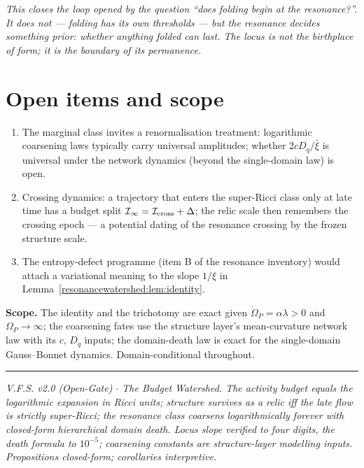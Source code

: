 \documentclass[11pt,a4paper,oneside]{book}
\newcommand{\Op}{\Omega_P}
\newcommand{\note}[1]{\textcolor{black!65}{\emph{#1}}}
\newcommand{\Dq}{D_q}
\newcommand{\Ib}{\mathcal I}
\theoremstyle{plain}
\theoremstyle{definition}
\theoremstyle{remark}
\begin{document}
\note{This closes the loop opened by the question ``does folding begin at the resonance?''. It does
not --- folding has its own thresholds --- but the resonance decides something prior: whether
anything folded can \emph{last}. The locus is not the birthplace of form; it is the boundary of its
permanence.}

\section{Open items and scope}

\begin{enumerate}[leftmargin=1.6em,itemsep=2pt]
\item The marginal class invites a renormalisation treatment: logarithmic coarsening laws typically
carry universal amplitudes; whether $2c\Dq/\bar\xi$ is universal under the network dynamics (beyond
the single-domain law) is open.
\item Crossing dynamics: a trajectory that enters the super-Ricci class only at late time has a
budget split $\Ib_\infty=\Ib_{\rm cross}+\Delta$; the relic scale then remembers the crossing epoch
--- a potential dating of the resonance crossing by the frozen structure scale.
\item The entropy-defect programme (item B of the resonance inventory) would attach a variational
meaning to the slope $1/\xi$ in Lemma~\ref{resonancewatershed:lem:identity}.
\end{enumerate}

\textbf{Scope.} The identity and the trichotomy are exact given $\dot\Op=\alpha\lambda>0$ and
$\Op\to\infty$; the coarsening fates use the structure layer's mean-curvature network law with its
$c$, $\Dq$ inputs; the domain-death law is exact for the single-domain Gauss--Bonnet dynamics.
Domain-conditional throughout.

\vspace{0.5em}
\hrule
\smallskip
\noindent\footnotesize\emph{V.F.S. v2.0 (Open-Gate) $\cdot$ The Budget Watershed. The activity budget
equals the logarithmic expansion in Ricci units; structure survives as a relic iff the late flow is
strictly super-Ricci; the resonance class coarsens logarithmically forever with closed-form
hierarchical domain death. Locus slope verified to four digits, the death formula to $10^{-5}$;
coarsening constants are structure-layer modelling inputs. Propositions closed-form; corollaries
interpretive.}
\end{document}
